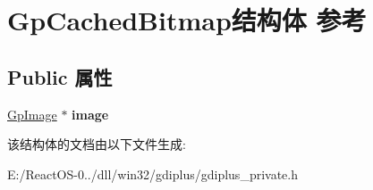 \hypertarget{struct_gp_cached_bitmap}{}\section{Gp\+Cached\+Bitmap结构体 参考}
\label{struct_gp_cached_bitmap}
\subsection*{Public 属性}
\begin{DoxyCompactItemize}
\item 
\mbox{\label{struct_gp_cached_bitmap_a3ceec41f95ca50741aad7f3dc64a542e}} 
\hyperlink{struct_gp_image}{Gp\+Image} $\ast$ {\bfseries image}
\end{DoxyCompactItemize}


该结构体的文档由以下文件生成\+:\begin{DoxyCompactItemize}
\item 
E\+:/\+React\+O\+S-\/0../dll/win32/gdiplus/gdiplus\+\_\+private.\+h\end{DoxyCompactItemize}
